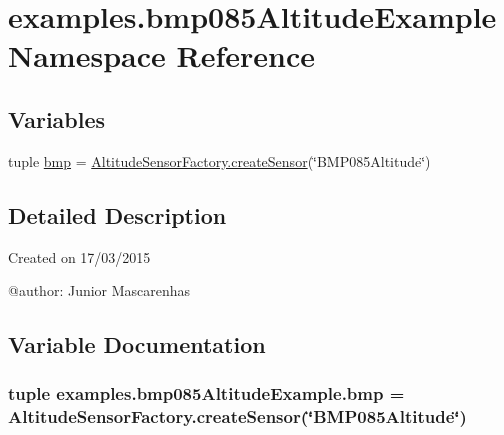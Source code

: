 \hypertarget{namespaceexamples_1_1bmp085AltitudeExample}{}\section{examples.\+bmp085\+Altitude\+Example Namespace Reference}
\label{namespaceexamples_1_1bmp085AltitudeExample}
\subsection*{Variables}
\begin{DoxyCompactItemize}
\item 
tuple \hyperlink{namespaceexamples_1_1bmp085AltitudeExample_a1f89e13f4efa3a3eacb6016c97d18d11}{bmp} = \hyperlink{classconcretefactory_1_1altitudeSensorFactory_1_1AltitudeSensorFactory_a9c77491290cc1495655080099863c61b}{Altitude\+Sensor\+Factory.\+create\+Sensor}(\char`\"{}B\+M\+P085\+Altitude\char`\"{})
\end{DoxyCompactItemize}


\subsection{Detailed Description}
\begin{DoxyVerb}Created on 17/03/2015

@author: Junior Mascarenhas
\end{DoxyVerb}
 

\subsection{Variable Documentation}
\hypertarget{namespaceexamples_1_1bmp085AltitudeExample_a1f89e13f4efa3a3eacb6016c97d18d11}{}
\subsubsection[{bmp}]{\setlength{\rightskip}{0pt plus 5cm}tuple examples.\+bmp085\+Altitude\+Example.\+bmp = {\bf Altitude\+Sensor\+Factory.\+create\+Sensor}(\char`\"{}B\+M\+P085\+Altitude\char`\"{})}\label{namespaceexamples_1_1bmp085AltitudeExample_a1f89e13f4efa3a3eacb6016c97d18d11}
